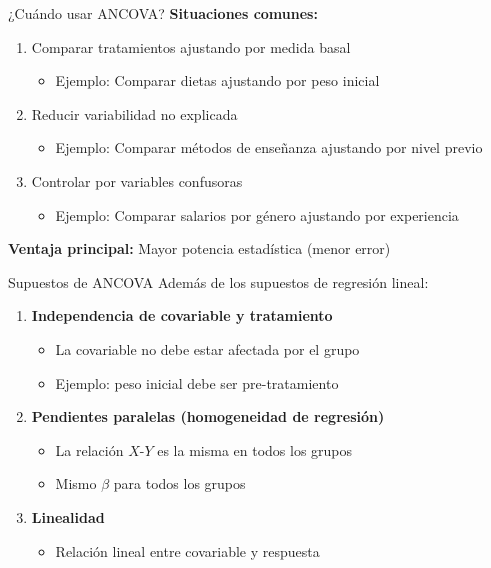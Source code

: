 \documentclass[aspectratio=169]{beamer}
\begin{document}
\begin{frame}{¿Cuándo usar ANCOVA?}
\textbf{Situaciones comunes:}
\begin{enumerate}
    \item Comparar tratamientos ajustando por medida basal
    \begin{itemize}
        \item Ejemplo: Comparar dietas ajustando por peso inicial
    \end{itemize}
    
    \item Reducir variabilidad no explicada
    \begin{itemize}
        \item Ejemplo: Comparar métodos de enseñanza ajustando por nivel previo
    \end{itemize}
    
    \item Controlar por variables confusoras
    \begin{itemize}
        \item Ejemplo: Comparar salarios por género ajustando por experiencia
    \end{itemize}
\end{enumerate}

\vspace{0.5cm}
\textbf{Ventaja principal:} Mayor potencia estadística (menor error)
\end{frame}

\begin{frame}{Supuestos de ANCOVA}
Además de los supuestos de regresión lineal:

\begin{enumerate}
    \item \textbf{Independencia de covariable y tratamiento}
    \begin{itemize}
        \item La covariable no debe estar afectada por el grupo
        \item Ejemplo: peso inicial debe ser pre-tratamiento
    \end{itemize}
    
    \item \textbf{Pendientes paralelas (homogeneidad de regresión)}
    \begin{itemize}
        \item La relación $X$-$Y$ es la misma en todos los grupos
        \item Mismo $\beta$ para todos los grupos
    \end{itemize}
    
    \item \textbf{Linealidad}
    \begin{itemize}
        \item Relación lineal entre covariable y respuesta
    \end{itemize}
\end{enumerate}
\end{frame}
\end{document}
